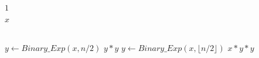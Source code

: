 \documentclass[12pt,a4paper]{article}
\begin{document}
	\begin{algorithm}
		\begin{algorithmic}
					\Return $ 1 $
				\EndIf
			
					\Return $ x $
				\EndIf
				
				\\
				
					\State $ y \gets Binary\_Exp(x, n/2) $
					\State \Return $ y * y $
				\Else
					\State $ y \gets Binary\_Exp(x, \lfloor n/2 \rfloor) $
					\State \Return $ x * y * y $
				\EndIf
			\EndProcedure
		\end{algorithmic}
	\end{algorithm}
\end{document}

